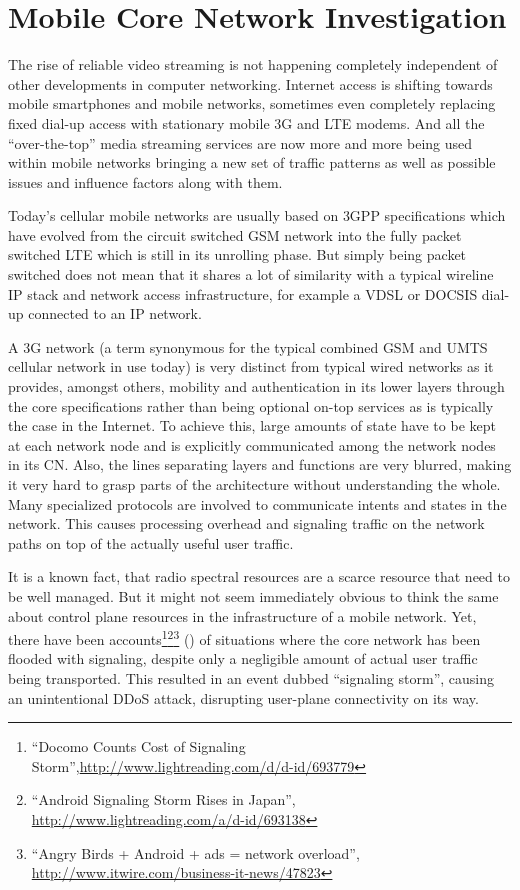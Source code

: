 \chapter{Mobile Core Network Investigation}
\label{chap:mobilenets}

The rise of reliable video streaming is not happening completely independent of other developments in computer networking. Internet access is shifting towards mobile smartphones and mobile networks, sometimes even completely replacing fixed dial-up access  with stationary mobile \gls{3G} and \gls{LTE} modems. And all the ``over-the-top'' media streaming services are now more and more being used within mobile networks bringing a new set of traffic patterns as well as possible issues and influence factors along with them.

Today's cellular mobile networks are usually based on \gls{3GPP} specifications which have evolved from the circuit switched \gls{GSM} network into the fully packet switched \gls{LTE} which is still in its unrolling phase. But simply being packet switched does not mean that it shares a lot of similarity with a typical wireline \gls{IP} stack and network access infrastructure, for example a \gls{VDSL} or \gls{DOCSIS} dial-up connected to an \gls{IP} network. 

A \gls{3G} network (a term synonymous for the typical combined \gls{GSM} and \gls{UMTS} cellular network in use today) is very distinct from typical wired networks as it provides, amongst others, mobility and authentication in its lower layers through the core specifications rather than being optional on-top services as is typically the case in the Internet. To achieve this, large amounts of state have to be kept at each network node and is explicitly communicated among the network nodes in its \gls{CN}. Also, the lines separating layers and functions are very blurred, making it very hard to grasp parts of the architecture without understanding the whole. Many specialized protocols are involved to communicate intents and states in the network. This causes processing overhead and signaling traffic on the network paths on top of the actually useful user traffic. 

It is a known fact, that radio spectral resources are a scarce resource that need to be well managed. But it might not seem immediately obvious to think the same about control plane resources in the infrastructure of a mobile network. Yet, there have been accounts\footnote{``Docomo Counts Cost of Signaling Storm'',\url{http://www.lightreading.com/d/d-id/693779}}\footnote{``Android Signaling Storm Rises in Japan'', \url{http://www.lightreading.com/a/d-id/693138}}\footnote{``Angry Birds + Android + ads = network overload'', \url{http://www.itwire.com/business-it-news/47823}} (\cite{huawei2011storm}) of situations where the core network has been flooded with signaling, despite only a negligible amount of actual user traffic being transported. This resulted in an event dubbed ``signaling storm'', causing an unintentional \gls{DDoS} attack, disrupting user-plane connectivity on its way.

